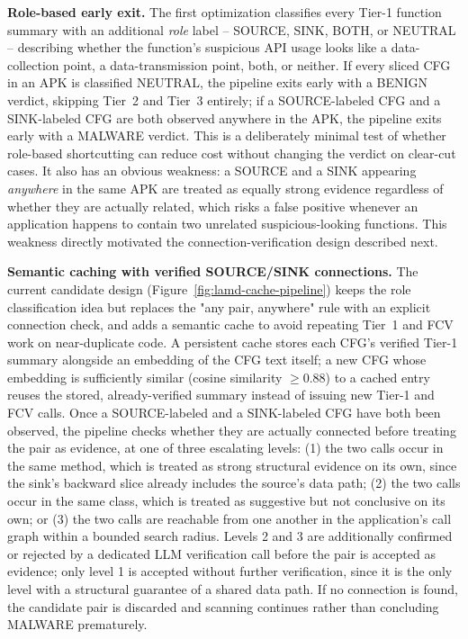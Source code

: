 \textbf{Role-based early exit.} The first optimization classifies every
Tier-1 function summary with an additional \emph{role} label -- SOURCE,
SINK, BOTH, or NEUTRAL -- describing whether the function's suspicious API
usage looks like a data-collection point, a data-transmission point, both,
or neither. If every sliced CFG in an APK is classified NEUTRAL, the pipeline
exits early with a BENIGN verdict, skipping Tier~2 and Tier~3 entirely; if a
SOURCE-labeled CFG and a SINK-labeled CFG are both observed anywhere in the
APK, the pipeline exits early with a MALWARE verdict. This is a deliberately
minimal test of whether role-based shortcutting can reduce cost without
changing the verdict on clear-cut cases. It also has an obvious weakness:
a SOURCE and a SINK appearing \emph{anywhere} in the same APK are treated as
equally strong evidence regardless of whether they are actually related,
which risks a false positive whenever an application happens to contain two
unrelated suspicious-looking functions. This weakness directly motivated the
connection-verification design described next.

\textbf{Semantic caching with verified SOURCE/SINK connections.} The current
candidate design (Figure~\ref{fig:lamd-cache-pipeline}) keeps the role
classification idea but replaces the "any pair, anywhere" rule with an
explicit connection check, and adds a semantic cache to avoid repeating
Tier~1 and FCV work on near-duplicate code. A persistent cache stores each
CFG's verified Tier-1 summary alongside an embedding of the CFG text itself;
a new CFG whose embedding is sufficiently similar (cosine similarity
$\geq 0.88$) to a cached entry reuses the stored, already-verified summary
instead of issuing new Tier-1 and FCV calls. Once a SOURCE-labeled and a
SINK-labeled CFG have both been observed, the pipeline checks whether they
are actually connected before treating the pair as evidence, at one of three
escalating levels: (1) the two calls occur in the same method, which is
treated as strong structural evidence on its own, since the sink's backward
slice already includes the source's data path; (2) the two calls occur in
the same class, which is treated as suggestive but not conclusive on its
own; or (3) the two calls are reachable from one another in the
application's call graph within a bounded search radius. Levels 2 and 3
are additionally confirmed or rejected by a dedicated LLM verification call
before the pair is accepted as evidence; only level 1 is accepted without
further verification, since it is the only level with a structural
guarantee of a shared data path. If no connection is found, the candidate
pair is discarded and scanning continues rather than concluding MALWARE
prematurely.


